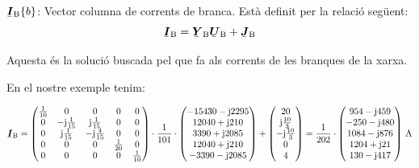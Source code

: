 \begin{list}{}
   \item[$\mcmplx{I}\ped{B}\{b\}$:]  Vector columna de corrents de branca. Est\`{a} definit per la relaci\'{o} seg\"{u}ent:
   \begin{equation}
      \mcmplx{I}\ped{B} = \mcmplx{Y}\ped{B} \mcmplx{U}\ped{B} + \mcmplx{J}\ped{B} \label{eq:ir}
   \end{equation}

   Aquesta \'{e}s la soluci\'{o} buscada pel que fa als corrents de les branques de la xarxa.

   En el nostre exemple tenim:
\end{list}
\[
   \mcmplx{I}\ped{B} =
   \begin{pmatrix}
         \frac{1}{10} & 0 & 0 & 0 & 0 \\
         0 & -\ju\frac{1}{15} & \ju\frac{1}{15} & 0 & 0 \\
         0 & \ju\frac{1}{15} & -\ju\frac{4}{15} & 0 & 0 \\
         0 & 0 & 0 & \frac{1}{20} & 0 \\
         0 & 0 & 0 & 0 & \frac{1}{10}
   \end{pmatrix} \cdot
   \frac{1}{101} \cdot \begin{pmatrix}
         -15430 - \ju 2295 \\
         12040 + \ju 210  \\
         3390 + \ju 2085 \\
         12040 + \ju 210  \\
         -3390 - \ju 2085
   \end{pmatrix}
   + \begin{pmatrix} 20 \\ \ju\frac{10}{3} \\ -\ju\frac{10}{3} \\ 0 \\ 4 \end{pmatrix} =
   \frac{1}{202} \cdot \begin{pmatrix}
         954 - \ju 459 \\
      -250 - \ju 480  \\
      1084 - \ju 876 \\
         1204 + \ju 21  \\
         130 - \ju 417
   \end{pmatrix}\unit{A}
\]

